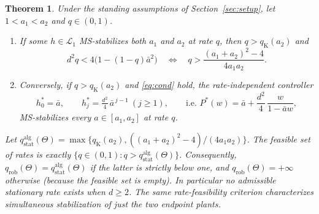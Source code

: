 \documentclass[preprint,12pt,numbers]{elsarticle}
\newtheorem{theorem}{Theorem}
\theoremstyle{definition}
\newcommand{\Lone}{\mathcal{L}_1}
\newcommand{\abar}{\bar a}
\newcommand{\qK}{q_{\mathrm K}}
\newcommand{\qrob}{q_{\mathrm{rob}}}
\begin{document}
\begin{theorem}\label{thm:main}
Under the standing assumptions of Section~\ref{sec:setup}, let $1<a_1<a_2$ and $q\in(0,1)$.
\begin{enumerate}[label=(\alph*),leftmargin=*]
\item If some $h\in\Lone$ MS-stabilizes both $a_1$ and $a_2$ at rate $q$, then $q>\qK(a_2)$ and
\begin{equation}\label{eq:cond}
d^2q<4\bigl(1-(1-q)\abar^2\bigr)\quad\Longleftrightarrow\quad q>\frac{(a_1+a_2)^2-4}{4a_1a_2}.
\end{equation}
\item Conversely, if $q>\qK(a_2)$ and \eqref{eq:cond} hold, the rate-independent controller
\begin{equation}\label{eq:hstar}
h^*_0=\abar,\qquad h^*_j=\tfrac{d^2}{4}\,\abar^{\,j-1}\ (j\ge1),\qquad\text{i.e. } P^*(w)=\abar+\frac{d^2}{4}\,\frac{w}{1-\abar w},
\end{equation}
MS-stabilizes every $a\in[a_1,a_2]$ at rate $q$.
\end{enumerate}
Let $q_{\mathrm{stat}}^{\mathrm{alg}}(\Theta)=\max\{\qK(a_2),((a_1+a_2)^2-4)/(4a_1a_2)\}$. The feasible set of rates is exactly $\{q\in(0,1):q>q_{\mathrm{stat}}^{\mathrm{alg}}(\Theta)\}$. Consequently, $\qrob(\Theta)=q_{\mathrm{stat}}^{\mathrm{alg}}(\Theta)$ if the latter is strictly below one, and $\qrob(\Theta)=+\infty$ otherwise (because the feasible set is empty). In particular no admissible stationary rate exists when $d\ge2$. The same rate-feasibility criterion characterizes simultaneous stabilization of just the two endpoint plants.
\end{theorem}
\end{document}
